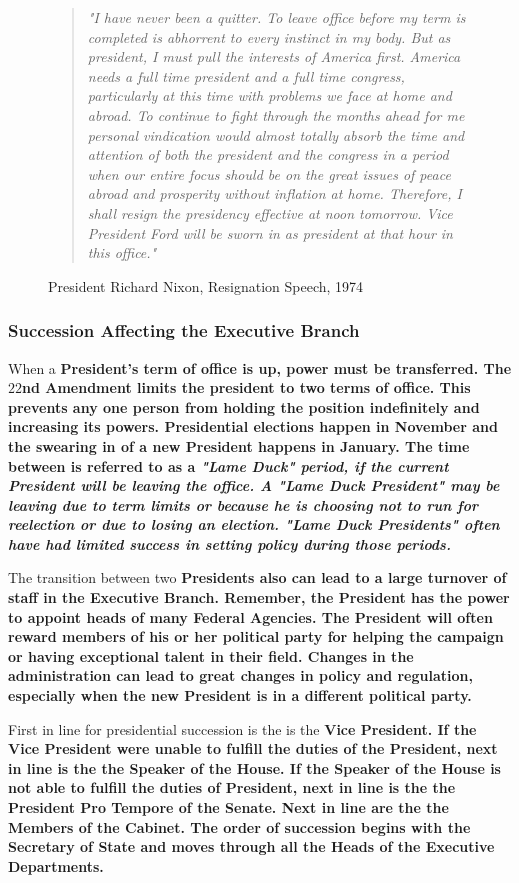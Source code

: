 \begin{figure}[h]
    \begin{quote}
        \it{"I have never been a quitter. To leave office before my term is
            completed is abhorrent to every instinct in my body. But as president, I
            must pull the interests of America first. America needs a full time
            president and a full time congress, particularly at this time with problems
            we face at home and abroad. To continue to fight through the months ahead for
            me personal vindication would almost totally absorb the time and attention of
            both the president and the congress in a period when our entire focus should be
            on the great issues of peace abroad and prosperity without inflation at home.
            Therefore, I shall resign the presidency effective at noon tomorrow. Vice
            President Ford will be sworn in as president at that hour in this office."}
    \end{quote}
    \caption{President Richard Nixon, Resignation Speech, 1974}
\end{figure}

\subsubsection*{Succession Affecting the Executive Branch}

When a \bf{President's} term of office is up, power must be transferred. The
$22$nd Amendment limits the president to two terms of office. This prevents any
one person from holding the position indefinitely and increasing its powers.
\bf{Presidential} elections happen in November and the swearing in of a new
\bf{President} happens in January. The time between is referred to as a
\it{"Lame Duck"} period, if the current \bf{President} will be leaving the
office. A \it{"Lame Duck President"} may be leaving due to term limits or
because he is choosing not to run for reelection or due to losing an election.
\it{"Lame Duck Presidents"} often have had limited success in setting policy
during those periods.

The transition between two \bf{Presidents} also can lead to a large turnover of
staff in the \bf{Executive Branch}. Remember, the \bf{President} has the power
to appoint heads of many \bf{Federal Agencies}. The \bf{President} will often
reward members of his or her political party for helping the campaign or having
exceptional talent in their field. Changes in the administration can lead to
great changes in policy and regulation, especially when the new \bf{President}
is in a different political party.

First in line for presidential succession is the is the \bf{Vice President}. If
the \bf{Vice President} were unable to fulfill the duties of the \bf{President},
next in line is the the \bf{Speaker of the House}. If the \bf{Speaker of the
House} is not able to fulfill the duties of \bf{President}, next in line is the
the \bf{President Pro Tempore of the Senate}. Next in line are the the
\bf{Members of the Cabinet}. The order of succession begins with the
\bf{Secretary of State} and moves through all the \bf{Heads of the Executive
Departments}.

\newpage
